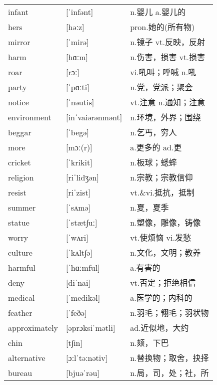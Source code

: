 \documentclass[a4paper]{article}
\begin{document}
\section{}
\begin{tabular}{l l l}

infant & [ˈinfənt] & n.婴儿 a.婴儿的 \\
hers & [həːz] & pron.她的(所有物) \\
mirror & [ˈmirə] & n.镜子 vt.反映，反射 \\
harm & [hɑːm] & n.伤害，损害 vt.损害 \\
roar & [rɔː] & vi.吼叫；呼喊 n.吼 \\
party & [ˈpɑːti] & n.党，党派；聚会 \\
notice & [ˈnəutis] & vt.注意 n.通知；注意 \\
environment & [inˈvaiərənmənt] & n.环境，外界；围绕 \\
beggar & [ˈbegə] & n.乞丐，穷人 \\
more & [mɔː(r)] & a.更多的 ad.更 \\
cricket & [ˈkrikit] & n.板球；蟋蟀 \\
religion & [riˈlidʒən] & n.宗教；宗教信仰 \\
resist & [riˈzist] & vt.\&vi.抵抗，抵制 \\
summer & [ˈsʌmə] & n.夏，夏季 \\
statue & [ˈstæt∫uː] & n.塑像，雕像，铸像 \\
worry & [ˈwʌri] & vt.使烦恼 vi.发愁 \\
culture & [ˈkʌlt∫ə] & n.文化，文明；教养 \\
harmful & [ˈhɑːmful] & a.有害的 \\
deny & [diˈnai] & vt.否定；拒绝相信 \\
medical & [ˈmedikəl] & a.医学的；内科的 \\
feather & [ˈfeðə] & n.羽毛；翎毛；羽状物 \\
approximately & [əprɔksiˈmətli] & ad.近似地，大约 \\
chin & [t∫in] & n.颏，下巴 \\
alternative & [ɔːlˈtəːnətiv] & n.替换物；取舍，抉择 \\
bureau & [bjuəˈrəu] & n.局，司，处；社，所 \\

\end{tabular}
\end{document}
